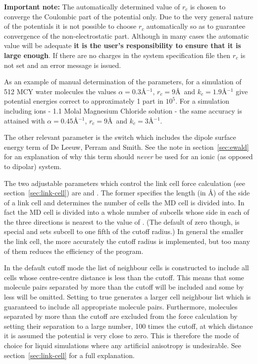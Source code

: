 \documentclass[a4paper,twoside]{report}
\newcommand{\Emph}[1]{\textbf{#1}}
\begin{document}
\Emph{Important note:} The automatically determined value of $r_c$
is chosen to converge the Coulombic part of the potential only.  Due
to the very general nature of the potentials it is not possible to
choose $r_c$ automatically so as to guarantee convergence of the
non-electrostatic part. Although in many cases the automatic value
will be adequate \Emph{it is the user's responsibility to ensure
  that it is large enough}. If there are no charges in the system
specification file then $r_c$ is not set and an error message is
issued.

As an example of manual determination of the parameters, for a
simulation of 512 MCY water molecules the values $\alpha =
0.3$\AA$^{-1}$, $r_{c} = 9$\AA\ and $k_{c} = 1.9$\AA$^{-1}$ give
potential energies correct to approximately 1 part in $10^{5}$.  For a
simulation including ions - 1.1 Molal Magnesium Chloride solution -
the same accuracy is attained with $\alpha = 0.45$\AA$^{-1}$, $r_{c} =
9$\AA\ and $k_{c} = 3$\AA$^{-1}$.

The other relevant parameter is the switch  which
includes the dipole surface energy term of De Leeuw, Perram and
Smith\cite{deleeuw:80}.  See the note in section~\ref{sec:ewald} for an
explanation of why this term should \emph{never} be used for an ionic
(as opposed to dipolar) system.

The two adjustable parameters which control the link cell force
calculation (see section~\ref{sec:link-cell}) are  and
. The former specifies the length (in \AA) of the side of
a link cell and determines the number of cells the MD cell is divided
into. In fact the MD cell is divided into a whole number of subcells
whose side in each of the three directions is nearest to the value of
.  (The default of zero though, is special and sets
subcell to one fifth of the cutoff radius.)  In general the smaller
the link cell, the more accurately the cutoff radius is implemented,
but too many of them reduces the efficiency of the program.

In the default cutoff mode  the list of
neighbour cells is constructed to include all cells whose
centre-centre distance is less than the cutoff.  This means that some
molecule pairs separated by more than the cutoff will be included and
some by less will be omitted.  Setting  to true
generates a larger cell neighbour list which is guaranteed to include
all appropriate molecule pairs.  Furthermore, molecules separated by
more than the cutoff are excluded from the force calculation by
setting their separation to a large number, 100 times the cutoff, at
which distance it is assumed the potential is very close to zero.
This is therefore the mode of choice for liquid simulations where any
artificial anisotropy is undesirable.  See section~\ref{sec:link-cell}
for a full explanation.
\end{document}

